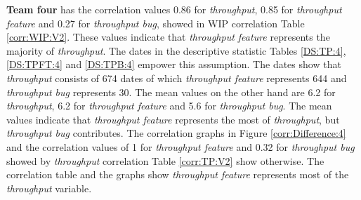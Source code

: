 \documentclass[UKenglish]{ifimaster}  %
\begin{document}
\textbf{Team four} has the correlation values 0.86 for \textit{throughput}, 0.85 for \textit{throughput feature}  and 0.27 for \textit{throughput bug}, showed in WIP correlation Table \ref{corr:WIP:V2}. These values indicate that \textit{throughput feature} represents the majority of \textit{throughput}. The dates in the descriptive statistic Tables \ref{DS:TP:4}, \ref{DS:TPFT:4} and \ref{DS:TPB:4} empower this assumption. The dates show that \textit{throughput} consists of 674 dates of which \textit{throughput feature} represents 644 and \textit{throughput bug} represents 30. The mean values on the other hand are 6.2 for \textit{throughput}, 6.2 for \textit{throughput feature} and 5.6 for \textit{throughput bug}. The mean values indicate that \textit{throughput feature} represents the most of \textit{throughput}, but \textit{throughput bug} contributes. The correlation graphs in Figure \ref{corr:Difference:4} and the correlation values of 1 for \textit{throughput feature} and 0.32 for \textit{throughput bug} showed by \textit{throughput} correlation Table \ref{corr:TP:V2} show otherwise. The correlation table and the graphs show  \textit{throughput feature} represents most of the \textit{throughput} variable.
\end{document}
